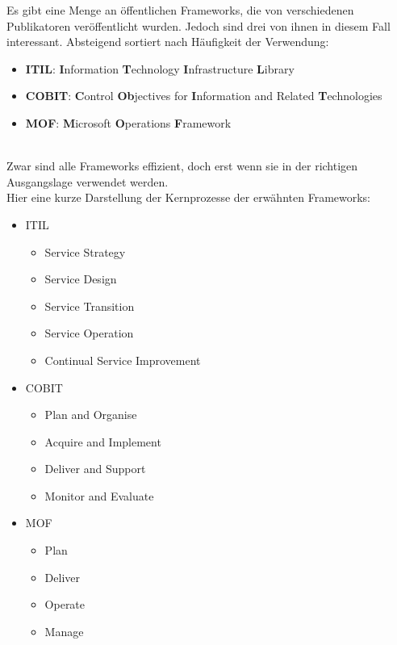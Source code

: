 Es gibt eine Menge an öffentlichen Frameworks, die von verschiedenen Publikatoren
veröffentlicht wurden. Jedoch sind drei von ihnen in diesem Fall interessant.
Absteigend sortiert nach Häufigkeit der Verwendung:
\\
\begin{itemize}
    \item \textbf{ITIL}:  \textbf{I}nformation \textbf{T}echnology \textbf{I}nfrastructure
                          \textbf{L}ibrary
    \item \textbf{COBIT}: \textbf{C}ontrol \textbf{Ob}jectives for \textbf{I}nformation 
                          and Related \textbf{T}echnologies
    \item \textbf{MOF}:   \textbf{M}icrosoft \textbf{O}perations \textbf{F}ramework
\end{itemize}
\noindent
\\
Zwar sind alle Frameworks effizient, doch erst wenn sie in der richtigen
Ausgangslage verwendet werden. 
\\
Hier eine kurze Darstellung der Kernprozesse der erwähnten Frameworks:

\begin{itemize}
    \item ITIL
    \begin{itemize}
        \item Service Strategy
        \item Service Design
        \item Service Transition
        \item Service Operation
        \item Continual Service Improvement
    \end{itemize}
    \item COBIT
    \begin{itemize}
        \item Plan and Organise
        \item Acquire and Implement
        \item Deliver and Support
        \item Monitor and Evaluate
    \end{itemize}
    \item MOF
    \begin{itemize}
        \item Plan
        \item Deliver
        \item Operate
        \item Manage
    \end{itemize}
\end{itemize}

